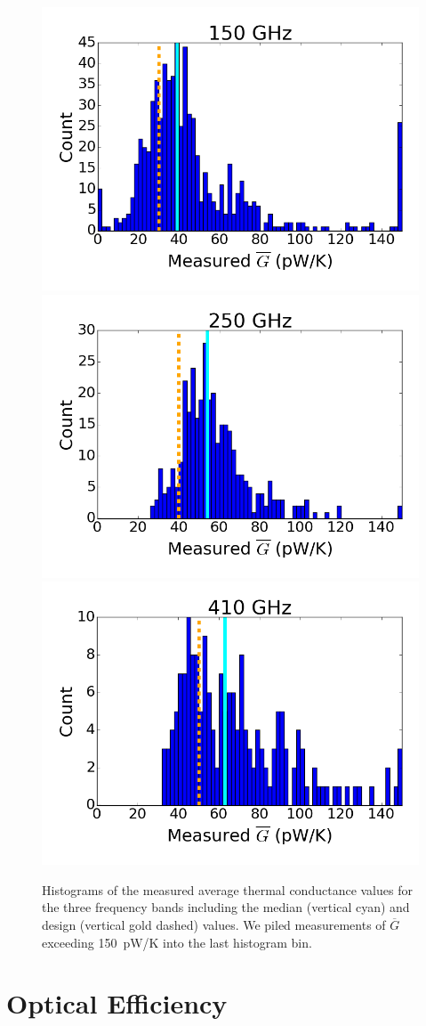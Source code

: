 \begin{figure}[ht!]
\centering
\includegraphics[width=0.31\columnwidth]{figures/150_g_bar_hist.png}
\includegraphics[width=0.31\columnwidth]{figures/250_g_bar_hist.png}
\includegraphics[width=0.31\columnwidth]{figures/410_g_bar_hist.png}
\caption{Histograms of the measured average thermal conductance values for the three frequency bands including the 
median (vertical cyan) and design (vertical gold dashed) values. 
We piled measurements of  $\overline{G}$ exceeding 150~pW/K into the last histogram bin.
}
\label{fig:G_Histograms} 
\end{figure}



\section{Optical Efficiency}
\label{sec:optical_efficiency}

